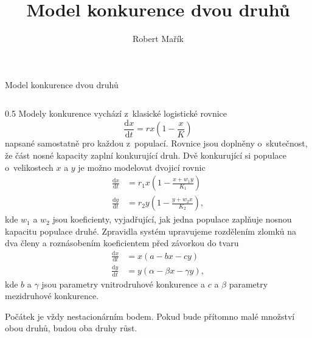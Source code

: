 \documentclass[handouts]{beamer}
\title{Model konkurence dvou druhů}
\author{Robert Mařík}
\begin{document}
\begin{frame}
\begin{center}
  \large Model konkurence dvou druhů
\end{center}


\begin{columns}
  \begin{column}{0.5\hsize}
Modely konkurence vychází z klasické logistické rovnice
$$    \frac{\mathrm dx}{\mathrm dt} = rx\left(1-\frac{x}{K}\right) $$
napsané samostatně pro každou z populací. Rovnice jsou doplněny o skutečnost, že část nosné kapacity zaplní konkurující druh. 
Dvě konkurující si populace o velikostech $x$ a $y$ je možno modelovat dvojicí
rovnic
\begin{equation*}
  \begin{aligned}
    \frac{\mathrm dx}{\mathrm dt} &= r_1x\left(1-\frac{x+w_1y}{K_1}\right) \\
    \frac{\mathrm dy}{\mathrm dt} &= r_2y\left(1-\frac{y+w_2x}{K_2}\right), 
  \end{aligned}
\end{equation*}
kde $w_1$ a $w_2$ jsou koeficienty, vyjadřující, jak jedna populace zaplňuje nosnou kapacitu populace druhé. 
Zpravidla systém upravujeme rozdělením zlomků na dva členy a roznásobením koeficientem před závorkou do tvaru
\begin{equation*}
  \begin{aligned}
    \frac{\mathrm dx}{\mathrm dt} &= x(a-bx-cy) \\
    \frac{\mathrm dy}{\mathrm dt} &= y(\alpha-\beta x - \gamma y), 
  \end{aligned}
\end{equation*}
kde $b$ a $\gamma$ jsou parametry vnitrodruhové konkurence a $c$ a $\beta$ parametry mezidruhové konkurence.

Počátek je vždy nestacionárním bodem. Pokud bude přítomno malé
množství obou druhů, budou oba druhy růst.


\end{column}
\end{columns}
\end{frame}
\end{document}
